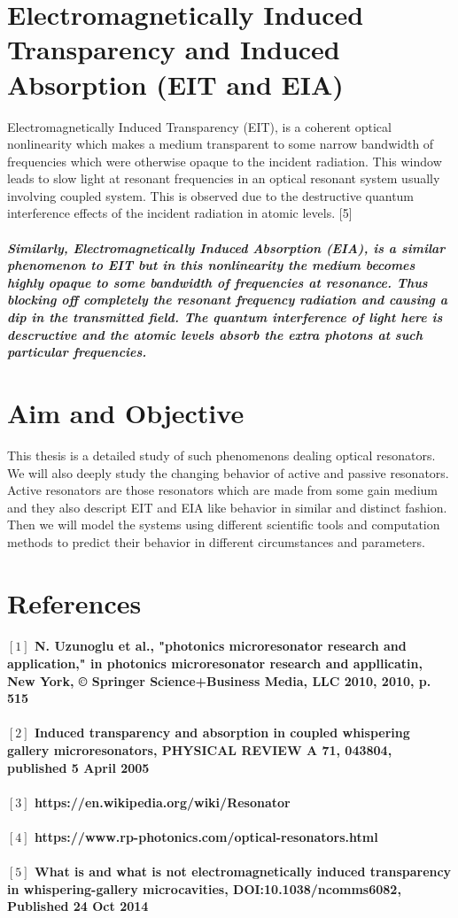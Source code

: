 \section{Electromagnetically Induced Transparency and Induced Absorption (EIT and EIA)}
Electromagnetically Induced Transparency (EIT), is a coherent optical nonlinearity which makes a medium transparent to some narrow bandwidth of frequencies which were otherwise opaque to the incident radiation. This window leads to slow light at resonant frequencies in an optical resonant system usually involving coupled system. This is observed due to the destructive quantum interference effects of the incident radiation in atomic levels. [5]

\subparagraph{\normalfont \large Similarly, Electromagnetically Induced Absorption (EIA), is a similar phenomenon to EIT but in this nonlinearity the medium becomes highly opaque to some bandwidth of frequencies at resonance. Thus blocking off completely the resonant frequency radiation and causing a dip in the transmitted field. The quantum interference of light here is descructive and the atomic levels absorb the extra photons at such particular frequencies. }

\section{Aim and Objective}
This thesis is a detailed study of such phenomenons dealing optical resonators. We will also deeply study the changing behavior of active and passive resonators. Active resonators are those resonators which are made from some gain medium and they also descript EIT and EIA like behavior in similar and distinct fashion. Then we will model the systems using different scientific tools and computation methods to predict their behavior in different circumstances and parameters. 


\newpage
\section*{References}

\paragraph{\normalfont \large $[1]$  N. Uzunoglu et al., "photonics  microresonator research and application," in photonics microresonator research and appllicatin, New York, © Springer Science+Business Media, LLC 2010, 2010, p. 515 \\ 
\\$[2]$ Induced transparency and absorption in coupled whispering gallery microresonators, PHYSICAL REVIEW A 71, 043804, published 5 April 2005\\
\\$[3]$ https://en.wikipedia.org/wiki/Resonator \\
\\$[4]$ https://www.rp-photonics.com/optical-resonators.html \\
\\$[5]$ What is and what is not electromagnetically induced transparency in whispering-gallery microcavities, DOI:10.1038/ncomms6082, Published 24 Oct 2014 }